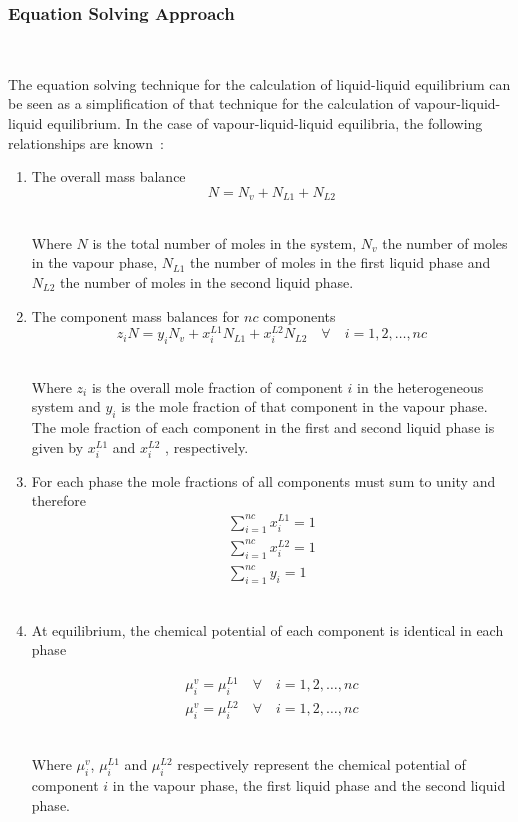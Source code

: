 \subsubsection{Equation Solving Approach}\

The equation solving technique for the calculation of liquid-liquid equilibrium can be seen as a simplification of that technique for the calculation of vapour-liquid-liquid equilibrium. In the case of vapour-liquid-liquid equilibria, the following relationships are known~\cite{PhaseEquilCalcsESandGEM, HybridFlashCalculations}:\
\begin{enumerate}
\item The overall mass balance\
	\begin{equation}
	N = N_{v} + N_{L1} + N_{L2} \label{OverallMassBalance}
	\end{equation}\	
	
	Where $N$ is the total number of moles in the system, $N_{v}$ the number of moles in the vapour phase, $N_{L1}$ the number of moles in the first liquid phase and $N_{L2}$ the number of moles in the second liquid phase.\

\item The component mass balances for $nc$ components
	\begin{equation}
	z_{i}N = y_{i}N_{v} + x_{i}^{L1}N_{L1} + x_{i}^{L2}N_{L2} \quad \forall \quad i = 1, 2,\ldots, nc \label{ComponentMassBalance}
	\end{equation}\
	
	Where $z_{i}$ is the overall mole fraction of component $i$ in the heterogeneous system and $y_{i}$ is the mole fraction of that component in the vapour phase. The mole fraction of each component in the first and second liquid phase is given by $x_{i}^{L1}$ and $x_{i}^{L2}$ , respectively.\

\item For each phase the mole fractions of all components must sum to unity and therefore\
	\begin{eqnarray}
	\sum_{i=1}^{nc} x_{i}^{L1} = 1 \label{PhaseL1Fractions}\\
	\sum_{i=1}^{nc} x_{i}^{L2} = 1\\
	\sum_{i=1}^{nc} y_{i} = 1 \label{PhaseVFractions}
	\end{eqnarray}\
	
\item At equilibrium, the chemical potential of each component is identical in each phase

	\begin{eqnarray}
	\mu_{i}^{v} = \mu_{i}^{L1} \quad \forall \quad i = 1, 2,\ldots, nc\label{VLLEEqualChemicalPotential1}\\
	\mu_{i}^{v} = \mu_{i}^{L2} \quad \forall \quad i = 1, 2,\ldots, nc\label{VLLEEqualChemicalPotential2}
	\end{eqnarray}\

	Where $\mu_{i}^{v}$, $\mu_{i}^{L1}$ and $\mu_{i}^{L2}$ respectively represent the chemical potential of component $i$ in the vapour phase, the first liquid phase and the second liquid phase.\

\end{enumerate}

